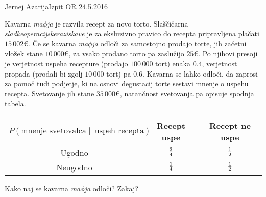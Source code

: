 \begin{naloga}{Jernej Azarija}{Izpit OR 24.5.2016}
\begin{vprasanje}
Kavarna {\em ma$\phi$ja} je razvila recept za novo torto.
Slaščičarna {\em sladkeoperacijskeraziskave}
je za eksluzivno pravico do recepta pripravljena plačati $15\,002 €$.
Če se kavarna {\em ma$\phi$ja} odloči za samostojno prodajo torte,
jih začetni vložek stane $10\,000 €$,
za vsako prodano torto pa zaslužijo $25 €$.
Po njihovi presoji
je verjetnost uspeha recepture (prodajo $100\,000$ tort) enaka $0.4$,
verjetnost propada (prodali bi zgolj $10\,000$ tort) pa $0.6$.
Kavarna se lahko odloči, da zaprosi za pomoč tudi pod\-jet\-je,
ki na osnovi degustacij torte sestavi mnenje o uspehu recepta.
Svetovanje jih stane $35\,000 €$,
natančnost svetovanja pa opisuje spodnja tabela.
\begin{center}
\begin{tabular}{c|cc}
$P(\text{mnenje svetovalca} \;|\;\ \text{uspeh recepta})$
& Recept uspe & Recept ne uspe \\ \hline
Ugodno   & ${3 \over 4}$ & ${1 \over 2}$ \\
Neugodno & ${1 \over 4}$ & ${1 \over 2}$
\end{tabular}
\end{center}
Kako naj se kavarna {\em ma$\phi$ja} odloči?
Zakaj?
\end{vprasanje}


\end{naloga}
